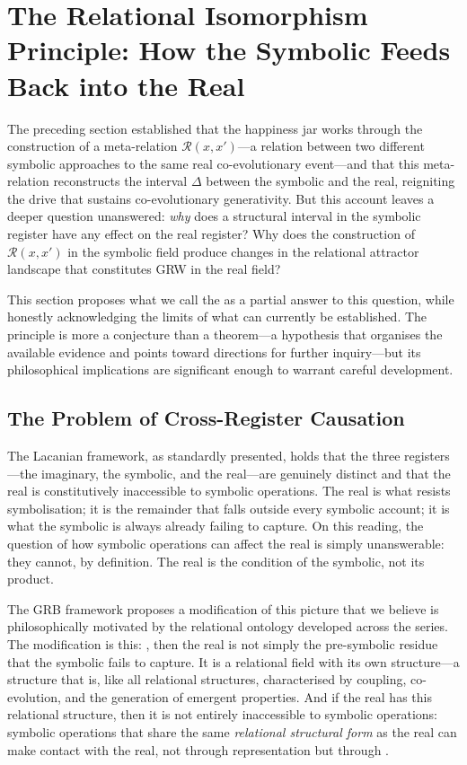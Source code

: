\section{The Relational Isomorphism Principle: How the Symbolic Feeds Back into the Real}
\label{p15:sec:isomorphism}

\noindent
The preceding section established that the happiness jar works through the construction of a meta-relation $\mathcal{R}(x, x')$---a relation between two different symbolic approaches to the same real co-evolutionary event---and that this meta-relation reconstructs the interval $\Delta$ between the symbolic and the real, reigniting the drive that sustains co-evolutionary generativity. But this account leaves a deeper question unanswered: \emph{why} does a structural interval in the symbolic register have any effect on the real register? Why does the construction of $\mathcal{R}(x, x')$ in the symbolic field produce changes in the relational attractor landscape that constitutes GRW in the real field?

This section proposes what we call the  as a partial answer to this question, while honestly acknowledging the limits of what can currently be established. The principle is more a conjecture than a theorem---a hypothesis that organises the available evidence and points toward directions for further inquiry---but its philosophical implications are significant enough to warrant careful development.

\subsection{The Problem of Cross-Register Causation}
\label{p15:subsec:crossregister}

\noindent
The Lacanian framework, as standardly presented, holds that the three registers---the imaginary, the symbolic, and the real---are genuinely distinct and that the real is constitutively inaccessible to symbolic operations. The real is what resists symbolisation; it is the remainder that falls outside every symbolic account; it is what the symbolic is always already failing to capture. On this reading, the question of how symbolic operations can affect the real is simply unanswerable: they cannot, by definition. The real is the condition of the symbolic, not its product.

The GRB framework proposes a modification of this picture that we believe is philosophically motivated by the relational ontology developed across the series. The modification is this: , then the real is not simply the pre-symbolic residue that the symbolic fails to capture. It is a relational field with its own structure---a structure that is, like all relational structures, characterised by coupling, co-evolution, and the generation of emergent properties. And if the real has this relational structure, then it is not entirely inaccessible to symbolic operations: symbolic operations that share the same \emph{relational structural form} as the real can make contact with the real, not through representation but through .

